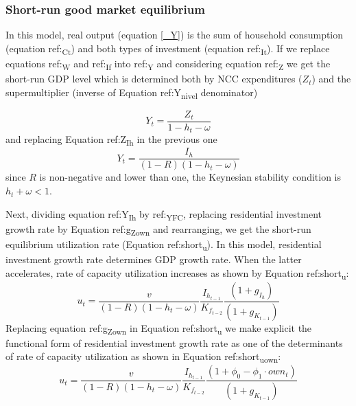 \documentclass[12pt]{article}
\begin{document}
\subsubsection{Short-run good market equilibrium}
\label{sec:orgef4dc89}
\label{short}

In this model, real output (equation \ref{_Y}) is the sum of household consumption (equation ref:\textsubscript{Ct}) and both types of investment (equation ref:\textsubscript{It}). 
If we replace equations ref:\textsubscript{W} and  ref:\textsubscript{If} into ref:\textsubscript{Y} and considering equation ref:\textsubscript{Z} we get the short-run GDP level which is determined both by NCC expenditures (\(Z_t\)) and the supermultiplier (inverse of Equation ref:Y\textsubscript{nivel} denominator)

\begin{equation}
\label{Y_nivel}
Y_t = \frac{Z_t}{1 - h_t - \omega}
\end{equation}
and replacing Equation ref:Z\textsubscript{Ih} in the previous one
\begin{equation}
\label{Y_Ih}
Y_t = \frac{I_h}{(1-R)(1 - h_t - \omega)}
\end{equation}
since \(R\) is non-negative and lower than one, the Keynesian stability condition is \(h_{t} + \omega < 1\).

Next, dividing equation ref:Y\textsubscript{Ih} by ref:\textsubscript{YFC},  replacing residential investment growth rate by Equation ref:g\textsubscript{Z}\textsubscript{own}  and rearranging, we get the short-run equilibrium utilization rate (Equation ref:short\textsubscript{u}).
In this model, residential investment growth rate determines GDP growth rate.
When the latter accelerates, rate of capacity utilization increases as shown by Equation ref:short\textsubscript{u}:
\begin{equation}
\label{short_u}
u_t = \frac{v}{(1-R)(1-h_t - \omega)}\frac{I_{h_{t-1}}}{K_{f_{t-2}}}\frac{(1 + g_{I_h})}{(1+g_{K_{t-1}})}
\end{equation}
Replacing equation ref:g\textsubscript{Z}\textsubscript{own} in Equation ref:short\textsubscript{u} we make explicit the functional form of residential investment growth rate as one of the determinants of rate of capacity utilization as shown in Equation ref:short\textsubscript{u}\textsubscript{own}:
\begin{equation}
\label{short_u_own}
u_t = \frac{v}{(1-R)(1-h_t - \omega)}\frac{I_{h_{t-1}}}{K_{f_{t-2}}}\frac{(1 + \phi_0 - \phi_1\cdot own_t)}{(1+g_{K_{t-1}})}
\end{equation}
\end{document}
